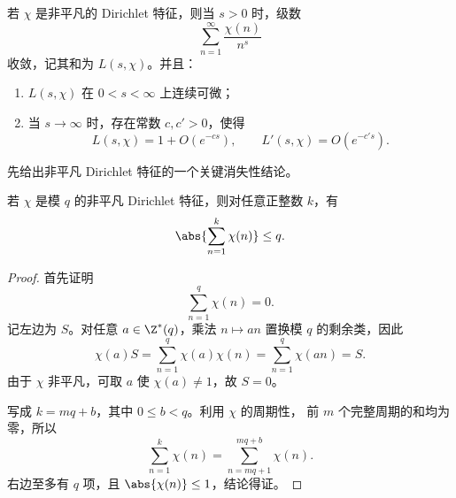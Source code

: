 \begin{proposition}\label{prop:nonprincipal-L-properties}
	若 $\chi$ 是非平凡的 Dirichlet 特征，则当 $s>0$ 时，级数
	\[
	\sum_{n=1}^{\infty}\frac{\chi(n)}{n^s}
	\]
	收敛，记其和为 $L(s,\chi)$。并且：
	\begin{enumerate}[label=\textup{(\roman*)}]
		\item $L(s,\chi)$ 在 $0<s<\infty$ 上连续可微；
		\item 当 $s\to\infty$ 时，存在常数 $c,c'>0$，使得
		\[
		L(s,\chi)=1+O(e^{-cs}),
		\qquad
		L'(s,\chi)=O(e^{-c's}).
		\]
	\end{enumerate}
\end{proposition}

先给出非平凡 Dirichlet 特征的一个关键消失性结论。

\begin{lemma}\label{lem:dirichlet-character-partial-sums}
	若 $\chi$ 是模 $q$ 的非平凡 Dirichlet 特征，则对任意正整数
	$k$，有
	\[
	\abs{\sum_{n=1}^{k}\chi(n)}\leq q.
	\]
\end{lemma}

\begin{proof}
	首先证明
	\[
	\sum_{n=1}^{q}\chi(n)=0.
	\]
	记左边为 $S$。对任意 $a\in\Z^*(q)$，乘法 $n\mapsto an$
	置换模 $q$ 的剩余类，因此
	\[
	\chi(a)S
	=\sum_{n=1}^{q}\chi(a)\chi(n)
	=\sum_{n=1}^{q}\chi(an)
	=S.
	\]
	由于 $\chi$ 非平凡，可取 $a$ 使 $\chi(a)\neq1$，故 $S=0$。

	写成 $k=mq+b$，其中 $0\leq b<q$。利用 $\chi$ 的周期性，
	前 $m$ 个完整周期的和均为零，所以
	\[
	\sum_{n=1}^{k}\chi(n)
	=\sum_{n=mq+1}^{mq+b}\chi(n).
	\]
	右边至多有 $q$ 项，且 $\abs{\chi(n)}\leq1$，结论得证。
\end{proof}

